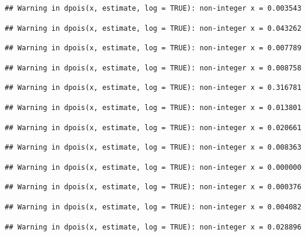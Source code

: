 \documentclass[]{article}
\begin{document}
\begin{verbatim}
## Warning in dpois(x, estimate, log = TRUE): non-integer x = 0.003543
\end{verbatim}

\begin{verbatim}
## Warning in dpois(x, estimate, log = TRUE): non-integer x = 0.043262
\end{verbatim}

\begin{verbatim}
## Warning in dpois(x, estimate, log = TRUE): non-integer x = 0.007789
\end{verbatim}

\begin{verbatim}
## Warning in dpois(x, estimate, log = TRUE): non-integer x = 0.008758
\end{verbatim}

\begin{verbatim}
## Warning in dpois(x, estimate, log = TRUE): non-integer x = 0.316781
\end{verbatim}

\begin{verbatim}
## Warning in dpois(x, estimate, log = TRUE): non-integer x = 0.013801
\end{verbatim}

\begin{verbatim}
## Warning in dpois(x, estimate, log = TRUE): non-integer x = 0.020661
\end{verbatim}

\begin{verbatim}
## Warning in dpois(x, estimate, log = TRUE): non-integer x = 0.008363
\end{verbatim}

\begin{verbatim}
## Warning in dpois(x, estimate, log = TRUE): non-integer x = 0.000000
\end{verbatim}

\begin{verbatim}
## Warning in dpois(x, estimate, log = TRUE): non-integer x = 0.000376
\end{verbatim}

\begin{verbatim}
## Warning in dpois(x, estimate, log = TRUE): non-integer x = 0.004082
\end{verbatim}

\begin{verbatim}
## Warning in dpois(x, estimate, log = TRUE): non-integer x = 0.028896
\end{verbatim}
\end{document}
